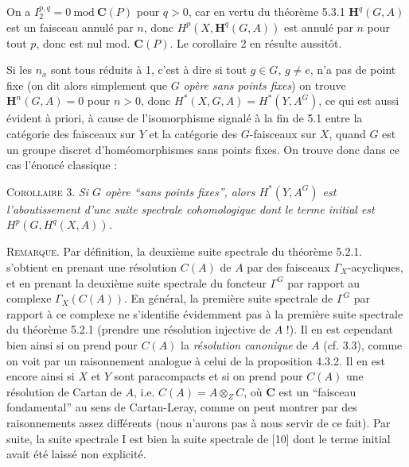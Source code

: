 \clearpage
{}

\noindent On a $I_2^{p,q}=0\ \mathrm{mod}\ {\mathbf C}(P)$ pour $q>0$, car en
vertu du théorème 5.3.1 $\mathbf H^q(G,A)$ est un faisceau annulé par $n$,
donc $H^p(X,\mathbf H^q(G,A))$ est annulé par $n$ pour tout $p$, donc est nul
mod. ${\mathbf C}(P)$. Le corollaire 2 en résulte aussitôt.

Si les $n_x$ sont tous réduits à 1, c'est à dire si tout $g\in G$, $g\ne e$,
n'a pas de point fixe (on dit alors simplement que $G$ \textit{opère sans
points fixes}) on trouve $\mathbf H^n(G,A)=0$ pour $n>0$, donc
$H^*(X,G,A)=H^*(Y,A^G)$, ce qui est aussi évident à priori, à cause de
l'isomorphisme signalé à la fin de 5.1 entre la catégorie des faisceaux sur
$Y$ et la catégorie des $G$-faisceaux sur $X$, quand $G$ est un groupe discret
d'homéomorphismes sans points fixes. On trouve donc dans ce cas l'énoncé
classique :

\textsc{Corollaire 3.} \textit{Si $G$ opère ``sans points fixes'',
alors $H^*(Y,A^G)$ est l'aboutissement d'une suite spectrale cohomologique dont
le terme initial est $H^p(G,H^q(X,A))$.}

\textsc{Remarque.} Par définition, la deuxième suite spectrale du
théorème 5.2.1. s'obtient en prenant une résolution $C(A)$ de $A$ par des
faisceaux $\Gamma_X$-acycliques, et en prenant la deuxième suite spectrale du
foncteur $\Gamma^G$ par rapport au complexe $\Gamma_X(C(A))$. En général, la
première suite spectrale de $\Gamma^G$ par rapport à ce complexe ne s'identifie
évidemment pas à la première suite spectrale du théorème 5.2.1 (prendre une
résolution injective de $A$ !). Il en est cependant bien ainsi si on prend pour
$C(A)$ la \textit{résolution canonique} de $A$ (cf. 3.3), comme on voit par un
raisonnement analogue à celui de la proposition 4.3.2. Il en est encore ainsi
si $X$ et $Y$ sont paracompacts et si on prend pour $C(A)$ une résolution de
Cartan de $A$, i.e. $C(A)=A\otimes_ZC$, où ${\mathbf C}$ est un ``faisceau
fondamental'' au sens de Cartan-Leray, comme on peut montrer par des
raisonnements assez différents (nous n'aurons pas à nous servir de ce fait).
Par suite, la suite spectrale I est bien la suite spectrale de [10] dont le
terme initial avait été laissé non explicité.

